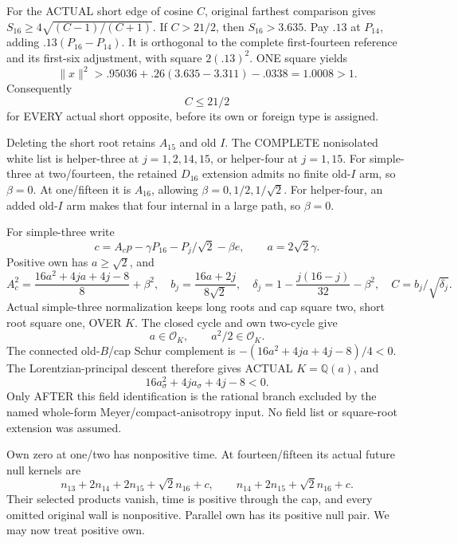 \documentclass[11pt]{article}
\begin{document}
For the ACTUAL short edge of cosine \(C\),
original farthest comparison gives
\(S_{16}\ge4\sqrt{(C-1)/(C+1)}\).
If \(C>21/2\), then \(S_{16}>3.635\).
Pay \(.13\) at \(P_{14}\), adding
\(.13(P_{16}-P_{14})\).
It is orthogonal to the complete first-fourteen
reference and its first-six adjustment,
with square \(2(.13)^2\).
ONE square yields
\[
                \|x\|^2>.95036+.26(3.635-3.311)-.0338
                            =1.0008>1 .
\]
Consequently
\[
                                    C\le21/2
\tag{B16Icut}\label{eq:arithB16Ishortcut}
\]
for EVERY actual short opposite, before
its own or foreign type is assigned.

Deleting the short root retains \(A_{15}\)
and old \(I\).
The COMPLETE nonisolated white list is
helper-three at \(j=1,2,14,15\), or
helper-four at \(j=1,15\).
For simple-three at two/fourteen,
the retained \(D_{16}\) extension admits
no finite old-\(I\) arm, so \(\beta=0\).
At one/fifteen it is \(A_{16}\), allowing
\(\beta=0,1/2,1/\sqrt2\).
For helper-four, an added old-\(I\) arm
makes that four internal in a large path,
so \(\beta=0\).

For simple-three write
\[
 c=A_cp-\gamma P_{16}-P_j/\sqrt2-\beta e,\qquad a=2\sqrt2\gamma .
\]
Positive own has \(a\ge\sqrt2\), and
\[
 A_c^2={\frac{16a^2+4ja+4j-8}{8}}+\beta^2,\quad
 b_j={\frac{16a+2j}{8\sqrt2}},\quad
 \delta_j=1-{\frac{j(16-j)}{32}}-\beta^2,\quad C=b_j/\sqrt{\delta_j}.
\]
Actual simple-three normalization keeps
long roots and cap square two, short
root square one, OVER \(K\).
The closed cycle and own two-cycle give
\[
                           a\in\mathcal O_K,\qquad a^2/2\in\mathcal O_K .
\]
The connected old-\(B\)/cap Schur
complement is
\(-(16a^2+4ja+4j-8)/4<0\).
The Lorentzian-principal descent therefore
gives ACTUAL \(K=\mathbb Q(a)\), and
\[
                          16a_\sigma^2+4ja_\sigma+4j-8<0 .
\]
Only AFTER this field identification is
the rational branch excluded by the
named whole-form Meyer/compact-anisotropy
input.
No field list or square-root extension
was assumed.

Own zero at one/two has nonpositive
time.
At fourteen/fifteen its actual future
null kernels are
\[
 n_{13}+2n_{14}+2n_{15}+\sqrt2n_{16}+c,\qquad
 n_{14}+2n_{15}+\sqrt2n_{16}+c .
\]
Their selected products vanish, time is
positive through the cap, and every
omitted original wall is nonpositive.
Parallel own has its positive null pair.
We may now treat positive own.
\end{document}
